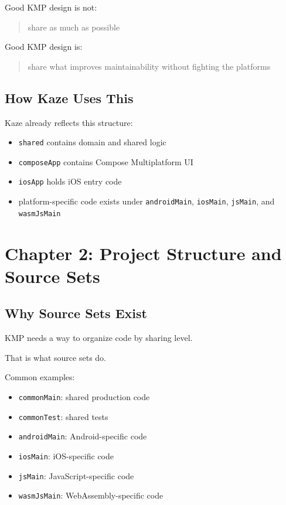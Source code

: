 \documentclass[11pt,a4paper]{article}
\begin{document}
Good KMP design is not:
\begin{quote}
share as much as possible
\end{quote}

Good KMP design is:
\begin{quote}
share what improves maintainability without fighting the platforms
\end{quote}

\subsection{How Kaze Uses This}

Kaze already reflects this structure:
\begin{itemize}
    \item \texttt{shared} contains domain and shared logic
    \item \texttt{composeApp} contains Compose Multiplatform UI
    \item \texttt{iosApp} holds iOS entry code
    \item platform-specific code exists under \texttt{androidMain}, \texttt{iosMain}, \texttt{jsMain}, and \texttt{wasmJsMain}
\end{itemize}

\section{Chapter 2: Project Structure and Source Sets}

\subsection{Why Source Sets Exist}

KMP needs a way to organize code by sharing level.

That is what source sets do.

Common examples:
\begin{itemize}
    \item \texttt{commonMain}: shared production code
    \item \texttt{commonTest}: shared tests
    \item \texttt{androidMain}: Android-specific code
    \item \texttt{iosMain}: iOS-specific code
    \item \texttt{jsMain}: JavaScript-specific code
    \item \texttt{wasmJsMain}: WebAssembly-specific code
\end{itemize}
\end{document}
